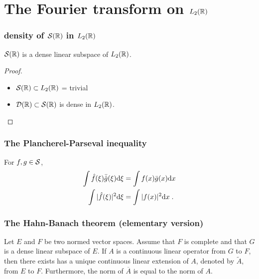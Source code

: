 \section{The Fourier transform on $L_2(\mathbb{R})$}
\begin{frame}
\frametitle{density of $\mathcal{S}(\mathbb{R})$ in $L_2(\mathbb{R})$}
\begin{theorem}
$\mathcal{S}(\mathbb{R})$ is a dense linear subspace of $L_2(\mathbb{R})$.
\end{theorem}
\begin{proof}
\begin{itemize}
\item $\mathcal{S}(\mathbb{R}) \subset L_2(\mathbb{R})$ = trivial
\item $\mathcal{D}(\mathbb{R}) \subset \mathcal{S}(\mathbb{R})$ is dense in $L_2(\mathbb{R})$.
\end{itemize}
\end{proof}
\end{frame}

\begin{frame}
\frametitle{The Plancherel-Parseval inequality}
\begin{theorem}
For $f, g \in \mathcal{S}$,
\begin{align*}
\int \hat{f}(\xi) \bar{\hat{g}}(\xi) \mathrm{d} \xi &= \int f(x) \bar{g}(x) \mathrm{d} x \\
\int |\hat{f}(\xi)|^2 \mathrm{d} \xi &= \int |f(x)|^2 \mathrm{d} x \;.
\end{align*}
\end{theorem}
\end{frame}

\begin{frame}
\frametitle{The Hahn-Banach theorem (elementary version)}
\begin{theorem}
 Let $E$  and $F$ be two normed vector spaces. Assume that $F$ is complete and that $G$ is a dense linear subspace of $E$.
 If $A$ is a continuous linear operator from $G$ to $F$, then there exists has a unique continuous linear extension of $A$,  denoted by $\tilde{A}$, from $E$  to $F$. Furthermore, the norm of $\overline{A}$ is equal to the norm of $A$.
\end{theorem}
\end{frame}

